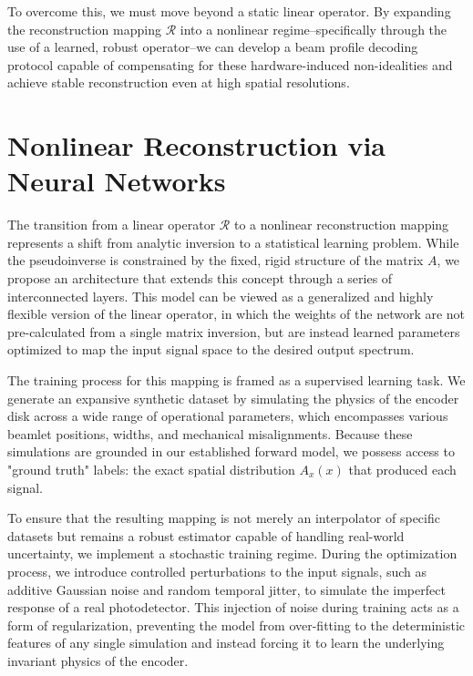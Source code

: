 \documentclass[12pt]{report}
\begin{document}
	To overcome this, we must move beyond a static linear operator. By expanding the reconstruction mapping $\mathcal{R}$ into a nonlinear regime--specifically through the use of a learned, robust operator--we can develop a beam profile decoding protocol capable of compensating for these hardware-induced non-idealities and achieve stable reconstruction even at high spatial resolutions.
	
	\section{Nonlinear Reconstruction via Neural Networks}
	
	
	The transition from a linear operator $\mathcal{R}$ to a nonlinear reconstruction mapping represents a shift from analytic inversion to a statistical learning problem. While the pseudoinverse is constrained by the fixed, rigid structure of the matrix $A$, we propose an architecture that extends this concept through a series of interconnected layers. This model can be viewed as a generalized and highly flexible version of the linear operator, in which the weights of the network are not pre-calculated from a single matrix inversion, but are instead learned parameters optimized to map the input signal space to the desired output spectrum.
	
	The training process for this mapping is framed as a supervised learning task. We generate an expansive synthetic dataset by simulating the physics of the encoder disk across a wide range of operational parameters, which encompasses various beamlet positions, widths, and mechanical misalignments. Because these simulations are grounded in our established forward model, we possess access to "ground truth" labels: the exact spatial distribution $A_x(x)$ that produced each signal.
	
	To ensure that the resulting mapping is not merely an interpolator of specific datasets but remains a robust estimator capable of handling real-world uncertainty, we implement a stochastic training regime. During the optimization process, we introduce controlled perturbations to the input signals, such as additive Gaussian noise and random temporal jitter, to simulate the imperfect response of a real photodetector. This injection of noise during training acts as a form of regularization, preventing the model from over-fitting to the deterministic features of any single simulation and instead forcing it to learn the underlying invariant physics of the encoder.
	
\end{document}
